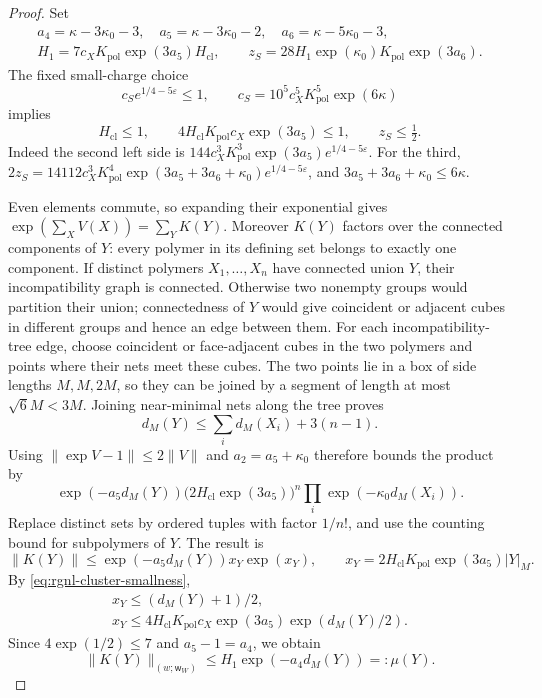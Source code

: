 \begin{proof}
Set
\[
 \begin{gathered}
 a_4=\kappa-3\kappa_0-3,\quad
 a_5=\kappa-3\kappa_0-2,\quad
 a_6=\kappa-5\kappa_0-3,\\
 H_1=7c_XK_{\mathrm{pol}}\exp(3a_5)H_{\mathrm{cl}},\qquad
 z_S=28H_1\exp(\kappa_0)K_{\mathrm{pol}}\exp(3a_6).
 \end{gathered}
\]
The fixed small-charge choice
\[
 c_S e^{1/4-5\varepsilon}\le1,\qquad
 c_S=10^5c_X^5K_{\mathrm{pol}}^5\exp(6\kappa)
\]
implies
\begin{equation}\label{eq:rgnl-cluster-smallness}
 H_{\mathrm{cl}}\le1,\qquad
 4H_{\mathrm{cl}}K_{\mathrm{pol}}c_X\exp(3a_5)\le1,\qquad
                                      z_S\le\tfrac12.
\end{equation}
Indeed the second left side is
$144c_X^3K_{\mathrm{pol}}^3\exp(3a_5)e^{1/4-5\varepsilon}$.
For the third,
$2z_S=14112c_X^3K_{\mathrm{pol}}^4
\exp(3a_5+3a_6+\kappa_0)e^{1/4-5\varepsilon}$, and
$3a_5+3a_6+\kappa_0\le6\kappa$.

Even elements commute, so expanding their exponential
gives $\exp(\sum_XV(X))=\sum_YK(Y)$.
Moreover $K(Y)$ factors over the connected components
of $Y$: every polymer in its defining set belongs to
exactly one component.
If distinct polymers $X_1,\ldots,X_n$ have connected
union $Y$, their incompatibility graph is connected.
Otherwise two nonempty groups would partition their
union; connectedness of $Y$ would give coincident or
adjacent cubes in different groups and hence an edge
between them.
For each incompatibility-tree edge, choose coincident or
face-adjacent cubes in the two polymers and points
where their nets meet these cubes. The two points
lie in a box of side lengths $M,M,2M$, so they
can be joined by a segment of length at most
$\sqrt6M<3M$. Joining near-minimal nets along
the tree proves
\[
 d_M(Y)\le\sum_i d_M(X_i)+3(n-1).
\]
Using $\|\exp V-1\|\le2\|V\|$ and $a_2=a_5+\kappa_0$
therefore bounds the product by
\[
 \exp(-a_5d_M(Y))
       \big(2H_{\mathrm{cl}}\exp(3a_5)\big)^n
                                  \prod_i \exp(-\kappa_0d_M(X_i)).
\]
Replace distinct sets by ordered tuples with factor $1/n!$,
and use the counting bound for subpolymers of $Y$. The result is
\[
 \|K(Y)\|\le \exp(-a_5d_M(Y))x_Y\exp(x_Y),\qquad
 x_Y=2H_{\mathrm{cl}}K_{\mathrm{pol}}\exp(3a_5)|Y|_M.
\]
By \eqref{eq:rgnl-cluster-smallness},
\[
 \begin{gathered}
 x_Y\le(d_M(Y)+1)/2,\\
 x_Y\le4H_{\mathrm{cl}}K_{\mathrm{pol}}c_X\exp(3a_5)\exp(d_M(Y)/2).
 \end{gathered}
\]
Since $4\exp(1/2)\le7$ and $a_5-1=a_4$, we obtain
\begin{equation}\label{eq:rgnl-Mayer-bound}
 \|K(Y)\|_{(w;\mathsf w_W)}
                         \le H_1\exp(-a_4d_M(Y))=:\mu(Y).
\end{equation}


\end{proof}
